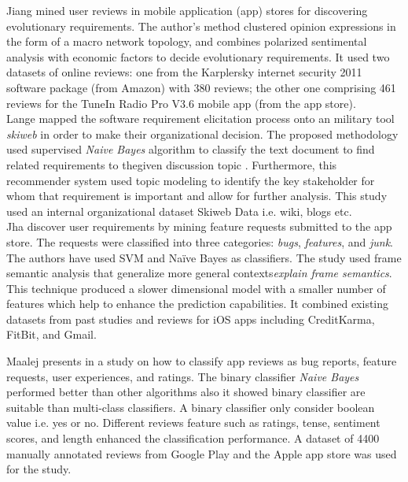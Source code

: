 Jiang \etal \cite{Jiang:2014} mined user reviews in mobile application
(app) stores for discovering evolutionary requirements. The author's method
clustered opinion expressions in the form of a macro network
topology, and combines polarized
sentimental analysis with economic factors to decide evolutionary
requirements. It used two datasets of online reviews: one from the
Karplersky internet security 2011 software package (from Amazon) with 380
reviews; the other one  comprising 461 reviews for the  TuneIn Radio Pro V3.6
mobile app (from the app store).\\

Lange \etal\cite{Douglas:S2008} mapped the software requirement elicitation
process onto an military tool \emph{skiweb} in order to make their organizational 
decision. The proposed methodology used supervised
\emph{Naive Bayes} algorithm to classify the text document to find related
requirements to thegiven discussion topic . Furthermore, this recommender
system used topic modeling to identify the key
stakeholder for whom that requirement is important and allow for further
analysis. This study used an internal organizational
dataset Skiweb Data i.e. wiki, blogs etc.\\

Jha \etal \cite{Jha:2017} discover user requirements by mining feature requests
submitted to the app store. The requests were classified into three categories:
\emph{bugs}, \emph{features}, and \emph{junk}. The authors have used SVM and
Naïve Bayes as classifiers. The study used frame semantic analysis that
generalize more general contexts\emph{explain frame semantics}. This technique
produced a slower dimensional model with a smaller number of
features which help to enhance the prediction capabilities. It combined existing
datasets from past studies and reviews for iOS apps including CreditKarma,
FitBit, and Gmail.

Maalej presents in \cite{Maalej} a study on how to classify app reviews as bug
reports, feature requests, user experiences, and ratings. The binary classifier
\emph{Naive Bayes} performed better than other algorithms also it showed binary
classifier are suitable than multi-class
classifiers. A binary classifier only consider boolean value i.e. yes or no. Different reviews feature such as ratings,
tense, sentiment scores, and length enhanced the classification performance. A
dataset of 4400 manually annotated reviews from Google Play and the Apple app
store was used for the study.\\

